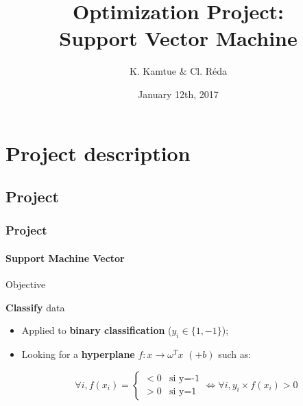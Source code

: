 \documentclass{beamer}
\title{Optimization Project:\\Support Vector Machine}
\author{K. Kamtue \& Cl. Réda}
\institute{\textsc{ENS Cachan}}
\date{January 12th, 2017}
\begin{document}
\maketitle
\tableofcontents
\setlength{\parindent}{1cm}

\section{Project description}

\subsection{Project}

\begin{frame}
\tableofcontents[currentsubsection]
\end{frame}

\begin{frame}
\frametitle{Project}
\framesubtitle{\textbf{Support Machine Vector}}

\begin{alertblock}{Objective}
\begin{center}
\textbf{Classify} data
\end{center}
\end{alertblock}

\pause

\begin{itemize}
\item Applied to \textbf{binary classification} ($y_i \in \{1, -1\}$);

\pause

\item Looking for a \textbf{hyperplane} $f : x \rightarrow \omega^Tx$ $(+ b)$ such as:
         
          \begin{center}
           \begin{equation}
         \forall i, f(x_i) = 
         \begin{cases}
         <0 &\mbox {si y=-1} \\
         >0 &\mbox {si y=1}
         \end{cases}
         \Leftrightarrow \forall i, y_i \times f(x_i) > 0 
         \end{equation}
         \end{center}
\end{itemize}

\end{frame}
\end{document}

